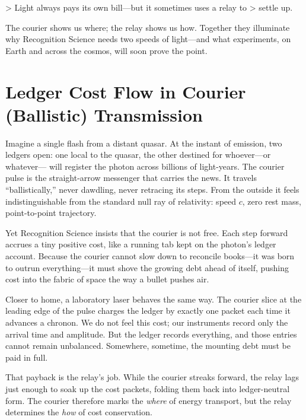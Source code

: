 \documentclass[11pt,oneside]{book}
\begin{document}
{> Light always pays its own bill—but it sometimes uses a relay to
> settle up.

The courier shows us where; the relay shows us how.  
Together they illuminate why Recognition Science needs two speeds of
light—and what experiments, on Earth and across the cosmos, will soon
prove the point.  

\section{Ledger Cost Flow in Courier (Ballistic) Transmission}
\label{sec:courier-narrative}

Imagine a single flash from a distant quasar.  
At the instant of emission, two ledgers open:  
one local to the quasar, the other destined for whoever—or whatever—
will register the photon across billions of light-years.  
The courier pulse is the straight-arrow messenger that carries the
news.  It travels “ballistically,” never dawdling, never retracing its
steps.  From the outside it feels indistinguishable from the standard
null ray of relativity: speed \(c\), zero rest mass, point-to-point
trajectory.

Yet Recognition Science insists that the courier is not free.  
Each step forward accrues a tiny positive cost, like a running tab
kept on the photon’s ledger account.  Because the courier cannot slow
down to reconcile books—it was born to outrun everything—it must shove
the growing debt ahead of itself, pushing cost into the fabric of
space the way a bullet pushes air.

Closer to home, a laboratory laser behaves the same way.  
The courier slice at the leading edge of the pulse charges the ledger
by exactly one packet each time it advances a chronon.  We do not feel
this cost; our instruments record only the arrival time and amplitude.
But the ledger records everything, and those entries cannot remain
unbalanced.  Somewhere, sometime, the mounting debt must be paid in
full.  

That payback is the relay’s job.  
While the courier streaks forward, the relay lags just enough to soak
up the cost packets, folding them back into ledger-neutral form.  
The courier therefore marks the \textit{where} of energy transport,
but the relay determines the \textit{how} of cost conservation.

}
\end{document}
